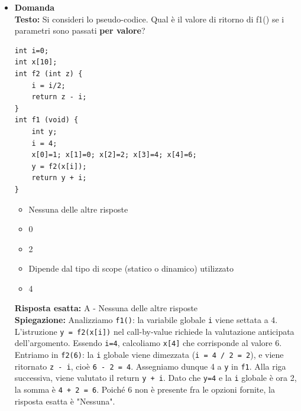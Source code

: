\documentclass[12pt, a4paper]{article}
\newcounter{domandateoria}
\begin{document}
\begin{itemize}
    \item {}\textbf{Domanda \thedomandateoria} \\
    \textbf{Testo:} Si consideri lo pseudo-codice. Qual è il valore di ritorno di f1() se i parametri sono passati \textbf{per valore}?
\begin{verbatim}
int i=0;
int x[10];
int f2 (int z) {
    i = i/2;
    return z - i;
}
int f1 (void) {
    int y;
    i = 4;
    x[0]=1; x[1]=0; x[2]=2; x[3]=4; x[4]=6;
    y = f2(x[i]);
    return y + i;
}
\end{verbatim}
    \begin{itemize}
        \item[A)] Nessuna delle altre risposte
        \item[B)] 0
        \item[C)] 2
        \item[D)] Dipende dal tipo di scope (statico o dinamico) utilizzato
        \item[E)] 4
    \end{itemize}
    \textbf{Risposta esatta:} A - Nessuna delle altre risposte \\
    \textbf{Spiegazione:} Analizziamo \texttt{f1()}: la variabile globale \texttt{i} viene settata a 4. L'istruzione \texttt{y = f2(x[i])} nel call-by-value richiede la valutazione anticipata dell'argomento. Essendo \texttt{i=4}, calcoliamo \texttt{x[4]} che corrisponde al valore 6. Entriamo in \texttt{f2(6)}: la \texttt{i} globale viene dimezzata (\texttt{i = 4 / 2 = 2}), e viene ritornato \texttt{z - i}, cioè \texttt{6 - 2 = 4}. Assegniamo dunque 4 a \texttt{y} in \texttt{f1}. Alla riga successiva, viene valutato il return \texttt{y + i}. Dato che \texttt{y=4} e la \texttt{i} globale è ora 2, la somma è \texttt{4 + 2 = 6}. Poiché 6 non è presente fra le opzioni fornite, la risposta esatta è "Nessuna".
    \vspace{0.3cm}

\newpage


\end{itemize}
\end{document}
